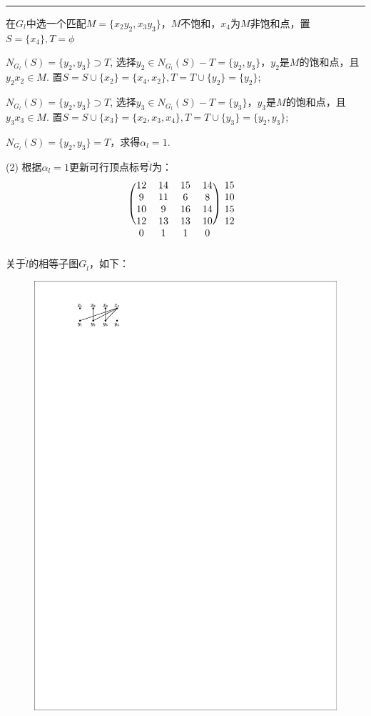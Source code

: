 \begin{example}
{\noindent}	 \rule[0pt]{\textwidth}{0.05em}
在$G_l$中选一个匹配$M=\{x_2y_2,x_3y_3\}$，$M$不饱和，$x_4$为$M$非饱和点，置$S=\{x_4\}, T=\phi$

$N_{G_l}(S)=\{y_2,y_3\}\supset T$, 选择$y_2\in N_{G_l}(S)-T=\{y_2,y_3\}$，$y_2$是$M$的饱和点，且$y_2x_2\in M$. 置$S=S\cup \{x_2\}=\{x_4,x_2\}, T=T\cup\{y_2\}=\{y_2\}$;

$N_{G_l}(S)=\{y_2,y_3\}\supset T$, 选择$y_3\in N_{G_l}(S)-T=\{y_3\}$，$y_3$是$M$的饱和点，且$y_3x_3\in M$. 置$S=S\cup \{x_3\}=\{x_2, x_3,x_4\}, T=T\cup\{y_3\}=\{y_2, y_3\}$;

$N_{G_l}(S)=\{y_2,y_3\}= T$，求得$\alpha_l=1$.

\noindent(2) 根据$\alpha_l=1$更新可行顶点标号$\hat{l}$为：
	\[
\begin{blockarray}{ccccc}
	\begin{block}{(cccc)c}
		12&14&15&14&15\\
		9&11&6&8&10\\
		10&9&16&14&15\\
		12&13&13&10&12\\
	\end{block}
	0&1&1&0&
\end{blockarray}
\]
关于$\hat{l}$的相等子图$G_{\hat{l}}$，如下：
\begin{figure}[H]
	\small
	\centering 
	\includegraphics[scale=1.2]{image/CH5_zuiyoupipei2.pdf}  
	\label{fikgksjjjl1KKk}  
\end{figure}





\end{example}

